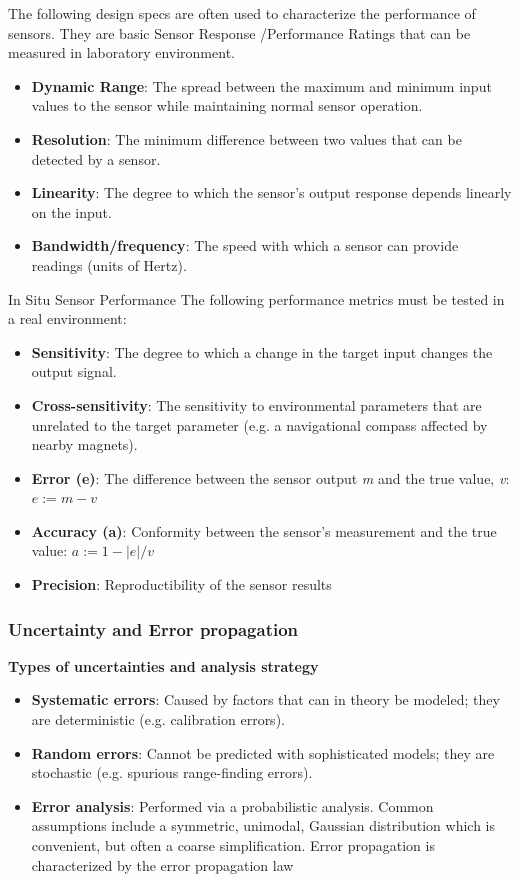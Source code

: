The following design specs are often used to characterize the performance of sensors. They are basic Sensor Response /Performance Ratings that can be measured in laboratory environment.
\begin{itemize}
  \item \textbf{Dynamic Range}: The spread between the maximum and minimum input values to the sensor while maintaining normal sensor operation.
  \item \textbf{Resolution}: The minimum difference between two values that can be detected by a sensor.
  \item \textbf{Linearity}: The degree to which the sensor's output response depends linearly on the input.
 \item \textbf{Bandwidth/frequency}: The speed with which a sensor can provide readings (units of Hertz).
\end{itemize}

In Situ Sensor Performance
The following performance metrics must be tested in a real environment:
\begin{itemize}
  \item \textbf{Sensitivity}: The degree to which a change in the target input changes the output signal.
  \item \textbf{Cross-sensitivity}: The sensitivity to environmental parameters that are unrelated to the target parameter (e.g. a navigational compass affected by nearby magnets).
  \item \textbf{Error (e)}: The difference between the sensor output \textit{m} and the true value, \textit{v}: $e:=m-v$
 \item \textbf{Accuracy (a)}: Conformity between the sensor's measurement and the true value: $a:=1-|e|/v$
 \item \textbf{Precision}: Reproductibility of the sensor results
\end{itemize}

\subsubsection{Uncertainty and Error propagation}
\textbf{Types of uncertainties and analysis strategy}
\begin{itemize}
    \item \textbf{Systematic errors}: Caused by factors that can in theory be modeled; they are deterministic (e.g. calibration errors).
    \item \textbf{Random errors}: Cannot be predicted with sophisticated models; they are stochastic (e.g. spurious range-finding errors).
    \item \textbf{Error analysis}: Performed via a probabilistic analysis. Common assumptions include a symmetric, unimodal, Gaussian distribution which is convenient, but often a coarse simplification. Error propagation is characterized by the error propagation law
\end{itemize}


